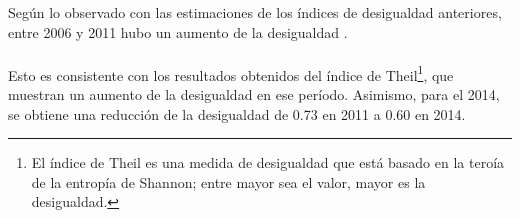  Según lo observado con las estimaciones de los índices de desigualdad anteriores, entre 2006 y 2011 hubo  un aumento de la desigualdad .\\ \\ 
 Esto es consistente con los resultados obtenidos del índice de Theil\footnote{El índice de Theil es una medida de desigualdad que está basado en la teroía de la entropía de Shannon; entre mayor sea el valor, mayor es la desigualdad.}, que muestran un aumento de la desigualdad en ese período. Asimismo, para el 2014, se obtiene una reducción de la desigualdad de 0.73 en 2011 a 0.60 en 2014.